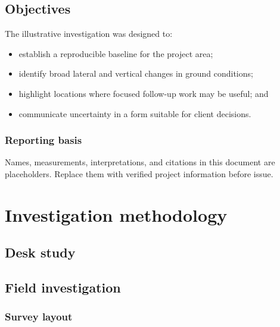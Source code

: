 \documentclass{erp-report}
\begin{document}
\section{Objectives}
The illustrative investigation was designed to:
\begin{itemize}
  \item establish a reproducible baseline for the project area;
  \item identify broad lateral and vertical changes in ground conditions;
  \item highlight locations where focused follow-up work may be useful; and
  \item communicate uncertainty in a form suitable for client decisions.
\end{itemize}

\subsection{Reporting basis}
\lipsum[4][1-4]

\begin{reportnote}
  Names, measurements, interpretations, and citations in this document are
  placeholders. Replace them with verified project information before issue.
\end{reportnote}

\chapter{Investigation methodology}

\section{Desk study}
\lipsum[5]

\section{Field investigation}
\lipsum[6]

\subsection{Survey layout}
\lipsum[7]

\begin{reportfigure}
  \caption{Placeholder for a project location plan with survey lines,
    investigation points, a north arrow, scale, and coordinate reference.}
  \label{fig:survey-layout}
\end{reportfigure}
\end{document}
